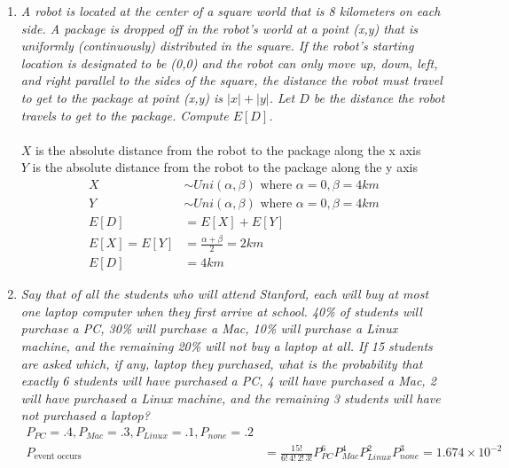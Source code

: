 \documentclass{article} %
\begin{document}
\thispagestyle{fancy} %

\begin{enumerate}
	
	\item \textit{A robot is located at the center of a square world that is 8 kilometers on each side. A package is dropped off in the robot's world at a point (x,y) that is uniformly (continuously) distributed in the square. If the robot's starting location is designated to be (0,0) and the robot can only move up, down, left, and right parallel to the sides of the square, the distance the robot must travel to get to the package at point (x,y) is $|x| + |y|$. Let $D$ be the distance the robot travels to get to the package. Compute $E[D]$.}\\
	\\
	$X$ is the absolute distance from the robot to the package along the x axis\\
	$Y$ is the absolute distance from the robot to the package along the y axis
	\begin{align*}
	X &\sim Uni(\alpha, \beta) \text{ where } \alpha = 0, \beta = 4 km\\
	Y &\sim Uni(\alpha, \beta) \text{ where } \alpha = 0, \beta = 4 km\\
	E[D] &= E[X] + E[Y]\\
	E[X] = E[Y] &= \frac{\alpha + \beta}{2} = 2 km\\
	E[D] &= 4 km
	\end{align*}
	
	\item \textit{Say that of all the students who will attend Stanford, each will buy at most one laptop computer when they first arrive at school. 40\% of students will purchase a PC, 30\% will purchase a Mac, 10\% will purchase a Linux machine, and the remaining 20\% will not buy a laptop at all. If 15 students are asked which, if any, laptop they purchased, what is the probability that exactly 6 students will have purchased a PC, 4 will have purchased a Mac, 2 will have purchased a Linux machine, and the remaining 3 students will have not purchased a laptop?}
	\begin{align*}
	P_{PC} = .4, P_{Mac} = .3, P_{Linux} = .1, P_{none} = .2\\
	P_{\text{event occurs}} &= \frac{15!}{6!\,4!\,2!\,3!} P_{PC}^6P_{Mac}^4P_{Linux}^2P_{none}^3 = 1.674 \times 10^{-2}
	\end{align*}
	

\end{enumerate}
\end{document}
